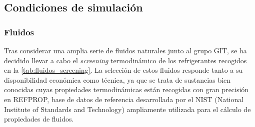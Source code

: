 \documentclass[../main.tex]{subfiles}
\begin{document}
\newpage


\subsection{Condiciones de simulación}

\subsubsection{Fluidos}

Tras considerar una amplia serie de fluidos naturales junto al grupo GIT, se ha decidido llevar a cabo el \textit{screening} termodinámico de los refrigerantes recogidos en la \autoref{tab:fluidos_screening}. La selección de estos fluidos responde tanto a su disponibilidad económica como técnica, ya que se trata de sustancias bien conocidas cuyas propiedades termodinámicas están recogidas con gran precisión en REFPROP, base de datos de referencia desarrollada por el NIST (National Institute of Standards and Technology) ampliamente utilizada para el cálculo de propiedades de fluidos.
\end{document}
